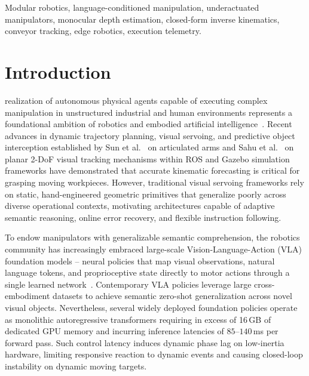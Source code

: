 \documentclass[journal]{IEEEtran}
\begin{document}
\begin{IEEEkeywords}
Modular robotics, language-conditioned manipulation, underactuated manipulators, monocular depth estimation, closed-form inverse kinematics, conveyor tracking, edge robotics, execution telemetry.
\end{IEEEkeywords}

\IEEEpeerreviewmaketitle

\section{Introduction}
 realization of autonomous physical agents capable of executing complex manipulation in unstructured industrial and human environments represents a foundational ambition of robotics and embodied artificial intelligence~\cite{aria_base_sun2022moving}. Recent advances in dynamic trajectory planning, visual servoing, and predictive object interception established by Sun et al.~\cite{aria_base_sun2022moving} on articulated arms and Sahu et al.~\cite{aria_010_sahu_2025_autonomous} on planar 2-DoF visual tracking mechanisms within ROS and Gazebo simulation frameworks have demonstrated that accurate kinematic forecasting is critical for grasping moving workpieces. However, traditional visual servoing frameworks rely on static, hand-engineered geometric primitives that generalize poorly across diverse operational contexts, motivating architectures capable of adaptive semantic reasoning, online error recovery, and flexible instruction following.

To endow manipulators with generalizable semantic comprehension, the robotics community has increasingly embraced large-scale Vision-Language-Action (VLA) foundation models -- neural policies that map visual observations, natural language tokens, and proprioceptive state directly to motor actions through a single learned network~\cite{kim2024openvla,zhao2023learning,pi0_2024,zitkovich2023rt2,firoozi2023foundation}. Contemporary VLA policies leverage large cross-embodiment datasets to achieve semantic zero-shot generalization across novel visual objects. Nevertheless, several widely deployed foundation policies operate as monolithic autoregressive transformers requiring in excess of 16\,GB of dedicated GPU memory and incurring inference latencies of $85\text{--}140$\,ms per forward pass. Such control latency induces dynamic phase lag on low-inertia hardware, limiting responsive reaction to dynamic events and causing closed-loop instability on dynamic moving targets.
\end{document}
